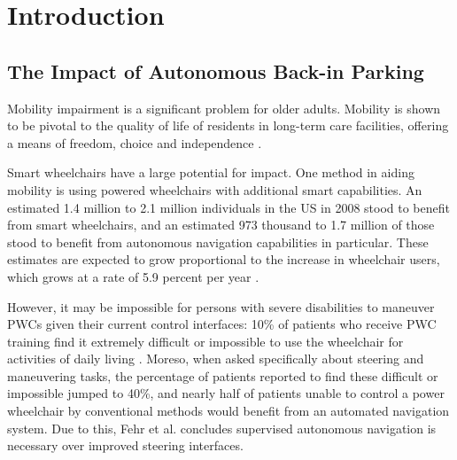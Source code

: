 

\chapter{Introduction}
\label{ch:Introduction}




\section{The Impact of Autonomous Back-in Parking}


Mobility impairment is a significant problem for older adults. Mobility is
shown to be pivotal to the quality of life of residents in long-term care
facilities, offering a means of freedom, choice and independence
\cite{bourret2002meaning}.

Smart wheelchairs have a large potential for impact.
One method in aiding mobility is using powered wheelchairs with additional smart
capabilities.
An estimated 1.4 million to 2.1 million individuals in the US in 2008 stood to
benefit from smart wheelchairs, and an estimated 973 thousand to 1.7 million of
those stood to benefit from autonomous navigation capabilities in particular.
These estimates are expected to grow proportional to the increase in
wheelchair users, which grows at a rate of 5.9 percent per year
\cite{simpson2008many}.

However, it may be impossible for persons with severe disabilities to maneuver PWCs
given their current control interfaces: 10\% of patients who receive PWC training
find it extremely difficult or impossible to use the wheelchair for activities of
daily living \cite{fehr2000adequacy}.
Moreso, when asked specifically about steering and maneuvering tasks, the
percentage of patients reported to find these difficult or impossible jumped to
40\%, and nearly half of patients unable to control a power wheelchair by
conventional methods would benefit from an automated navigation system.
Due to this, Fehr et al. \cite{fehr2000adequacy} concludes supervised autonomous
navigation is necessary over improved steering interfaces.

